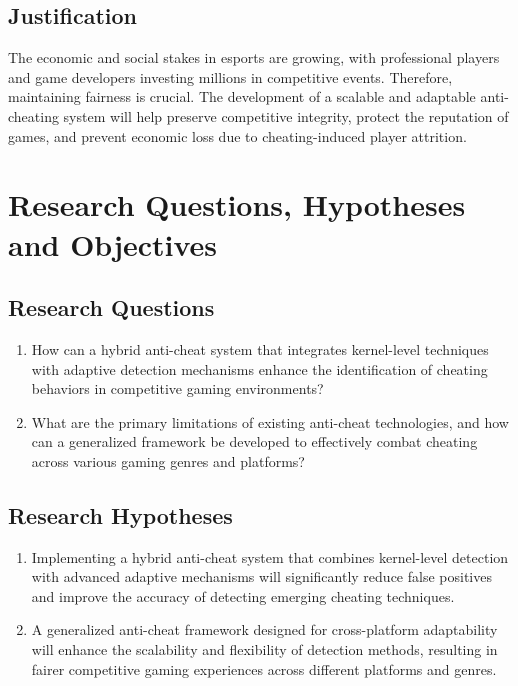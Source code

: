 \documentclass[a4paper, 12pt]{article}
\begin{document}
\subsection{Justification}
The economic and social stakes in esports are growing, with professional players and game developers investing millions in competitive events. Therefore, maintaining fairness is crucial. The development of a scalable and adaptable anti-cheating system will help preserve competitive integrity, protect the reputation of games, and prevent economic loss due to cheating-induced player attrition.

\section{Research Questions, Hypotheses and Objectives}
\subsection{Research Questions}
    \begin{enumerate}
        \item How can a hybrid anti-cheat system that integrates kernel-level techniques with adaptive detection mechanisms enhance the identification of cheating behaviors in competitive gaming environments?
        \item What are the primary limitations of existing anti-cheat technologies, and how can a generalized framework be developed to effectively combat cheating across various gaming genres and platforms?
    \end{enumerate}
\subsection{Research Hypotheses}
\begin{enumerate}
    \item Implementing a hybrid anti-cheat system that combines kernel-level detection with advanced adaptive mechanisms will significantly reduce false positives and improve the accuracy of detecting emerging cheating techniques.
    \item A generalized anti-cheat framework designed for cross-platform adaptability will enhance the scalability and flexibility of detection methods, resulting in fairer competitive gaming experiences across different platforms and genres.
\end{enumerate}
\end{document}
